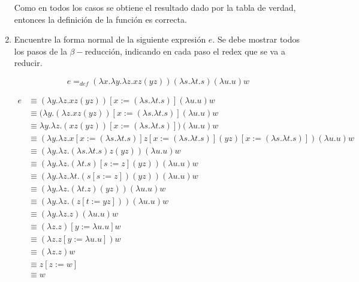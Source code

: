 \documentclass{article}
\begin{document}
\begin{enumerate}
{\begin{itemize}
{\begin{itemize}
{                            Como en todos los casos se obtiene el resultado dado
                            por la tabla de verdad, entonces la definición de la
                            función es correcta.
                        }
                    \end{itemize}
                }
            \end{itemize}
        }

        \item {
            Encuentre la forma normal de la siguiente expresión $e$. Se debe
            mostrar todos los pasos de la $\beta-$reducción, indicando en cada
            paso el redex que se va a reducir.

            \[
                e =_{def} (\lambda x. \lambda y. \lambda z.xz(yz))
                (\lambda s. \lambda t.s)
                (\lambda u. u) w
            \]

            \begin{align*}
                e &\equiv (\lambda y. \lambda z.xz(yz))[x:=(\lambda s. \lambda t.s)]
                (\lambda u. u) w \\
                &\equiv (\lambda y. (\lambda z.xz(yz))[x:=(\lambda s. \lambda t.s)]
                (\lambda u. u) w \\
                &\equiv \lambda y. \lambda z.(xz(yz))[x:=(\lambda s. \lambda t.s)])
                (\lambda u. u) w \\
                &\equiv (\lambda y. \lambda z.
                x[x:=(\lambda s. \lambda t.s)]
                z[x:=(\lambda s. \lambda t.s)]
                (yz)[x:=(\lambda s. \lambda t.s)])
                (\lambda u. u) w \\
                &\equiv (\lambda y. \lambda z.
                (\lambda s. \lambda t.s)z(yz))
                (\lambda u. u) w \\
                &\equiv (\lambda y. \lambda z.
                (\lambda t.s)[s := z](yz))
                (\lambda u. u) w \\
                &\equiv (\lambda y. \lambda z.
                \lambda t.(s[s := z])(yz))
                (\lambda u. u) w \\
                &\equiv (\lambda y. \lambda z.
                (\lambda t.z)(yz))
                (\lambda u. u) w \\
                &\equiv (\lambda y. \lambda z.
                (z[t:=yz]))
                (\lambda u. u) w \\
                &\equiv (\lambda y. \lambda z.z)
                (\lambda u. u) w \\
                &\equiv (\lambda z.z) [y:=\lambda u. u] w \\
                &\equiv (\lambda z.z[y:=\lambda u. u]) w \\
                &\equiv (\lambda z.z) w \\
                &\equiv z [z:=w] \\
                &\equiv w \\
            \end{align*}
        }
    \end{enumerate}
\end{document}
